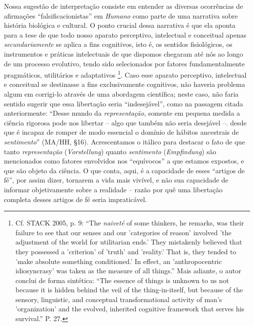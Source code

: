 \documentclass[
	12pt,				%
	openright,			%
	oneside,			%
	a4paper,			%
	english,			%
	french,				%
	spanish,			%
	brazil				%
	]{abntex2}
\begin{document}
Nossa sugestão de interpretação consiste em entender as diversas ocorrências de afirmações “falsificacionistas” em \textit{Humano} como parte de uma narrativa sobre história biológica e cultural. O ponto crucial dessa narrativa é que ela aponta para a tese de que todo nosso aparato perceptivo, intelectual e conceitual apenas \textit{secundariamente} se aplica a fins cognitivos, isto é, os sentidos fisiológicos, os instrumentos e práticas intelectuais de que dispomos chegaram até nós ao longo de um processo evolutivo, tendo sido selecionados por fatores fundamentalmente pragmáticos, utilitários e adaptativos
\footnote{Cf. STACK 2005, p. 9: “The \textit{naiveté} of some thinkers, he remarks, was their failure to see that our senses and our 'categories of reason' involved 'the adjustment of the world for utilitarian ends.' They mistakenly believed that they possessed a 'criterion' of 'truth' and 'reality.' That is, they tended to 'make absolute something conditioned.' In effect, an 'anthropocentric idiosyncrasy' was taken as the measure of all things.” Mais adiante, o autor conclui de forma sintética: “The essence of things is unknown to us not because it is hidden behind the veil of the thing-in-itself, but because of the sensory, linguistic, and conceptual transformational activity of man's 'organization' and the evolved, inherited cognitive framework that serves his survival.” P. 27.}. 
Caso esse aparato perceptivo, intelectual e conceitual se destinasse a fins exclusivamente cognitivos, não haveria problema algum em corrigi-lo através de uma abordagem científica; neste caso, não faria sentido sugerir que essa libertação seria “indesejável”, como na passagem citada anteriormente: “Desse mundo da \textit{representação}, somente em pequena medida a ciência rigorosa pode nos libertar – algo que também não seria desejável –. desde que é incapaz de romper de modo essencial o domínio de hábitos ancestrais de \textit{sentimento}” (MA/HH, §16). Acrescentamos o itálico para destacar o fato de que tanto \textit{representação} (\textit{Vorstellung}) quanto \textit{sentimento} (\textit{Empfindung}) são mencionados como fatores envolvidos nos “equívocos” a que estamos expostos, e que são objeto da ciência. O que conta, aqui, é a capacidade de esses “artigos de fé”, por assim dizer, tornarem a vida mais vivível, e não sua capacidade de informar objetivamente sobre a realidade – razão por quê uma libertação completa desses artigos de fé seria impraticável.
\end{document}
